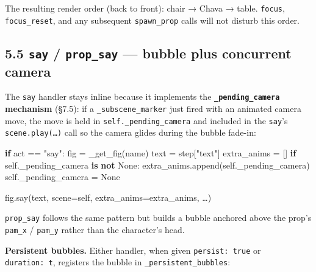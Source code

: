 \documentclass[
  12pt,
  letterpaper,
]{book}
\newenvironment{Shaded}{}{}
\newcommand{\ControlFlowTok}[1]{\textcolor[rgb]{0.00,0.44,0.13}{\textbf{#1}}}
\newcommand{\KeywordTok}[1]{\textcolor[rgb]{0.00,0.44,0.13}{\textbf{#1}}}
\newcommand{\NormalTok}[1]{#1}
\newcommand{\OperatorTok}[1]{\textcolor[rgb]{0.40,0.40,0.40}{#1}}
\newcommand{\StringTok}[1]{\textcolor[rgb]{0.25,0.44,0.63}{#1}}
\newcommand{\VariableTok}[1]{\textcolor[rgb]{0.10,0.09,0.49}{#1}}
\begin{document}
The resulting render order (back to front): chair → Chava → table.
\texttt{focus}, \texttt{focus\_reset}, and any subsequent
\texttt{spawn\_prop} calls will not disturb this order.

\subsection{\texorpdfstring{5.5 \texttt{say} / \texttt{prop\_say} ---
bubble plus concurrent
camera}{5.5 say / prop\_say --- bubble plus concurrent camera}}\label{say-prop_say-bubble-plus-concurrent-camera}

The \texttt{say} handler stays inline because it implements the
\textbf{\texttt{\_pending\_camera} mechanism} (§7.5): if a
\texttt{\_subscene\_marker} just fired with an animated camera move, the
move is held in \texttt{self.\_pending\_camera} and included in the
\texttt{say}'s \texttt{scene.play(…)} call so the camera glides during
the bubble fade-in:

\begin{Shaded}
\begin{Highlighting}[]
\ControlFlowTok{if}\NormalTok{ act }\OperatorTok{==} \StringTok{"say"}\NormalTok{:}
\NormalTok{    fig }\OperatorTok{=}\NormalTok{ \_get\_fig(name)}
\NormalTok{    text }\OperatorTok{=}\NormalTok{ step[}\StringTok{"text"}\NormalTok{]}
\NormalTok{    extra\_anims }\OperatorTok{=}\NormalTok{ []}
    \ControlFlowTok{if} \VariableTok{self}\NormalTok{.\_pending\_camera }\KeywordTok{is} \KeywordTok{not} \VariableTok{None}\NormalTok{:}
\NormalTok{        extra\_anims.append(}\VariableTok{self}\NormalTok{.\_pending\_camera)}
        \VariableTok{self}\NormalTok{.\_pending\_camera }\OperatorTok{=} \VariableTok{None}

\NormalTok{    fig.say(text, scene}\OperatorTok{=}\VariableTok{self}\NormalTok{,}
\NormalTok{            extra\_anims}\OperatorTok{=}\NormalTok{extra\_anims,}
\NormalTok{            …)}
\end{Highlighting}
\end{Shaded}

\texttt{prop\_say} follows the same pattern but builds a bubble anchored
above the prop's \texttt{pam\_x} / \texttt{pam\_y} rather than the
character's head.

\textbf{Persistent bubbles.} Either handler, when given
\texttt{persist:\ true} or \texttt{duration:\ t}, registers the bubble
in \texttt{\_persistent\_bubbles}:
\end{document}

